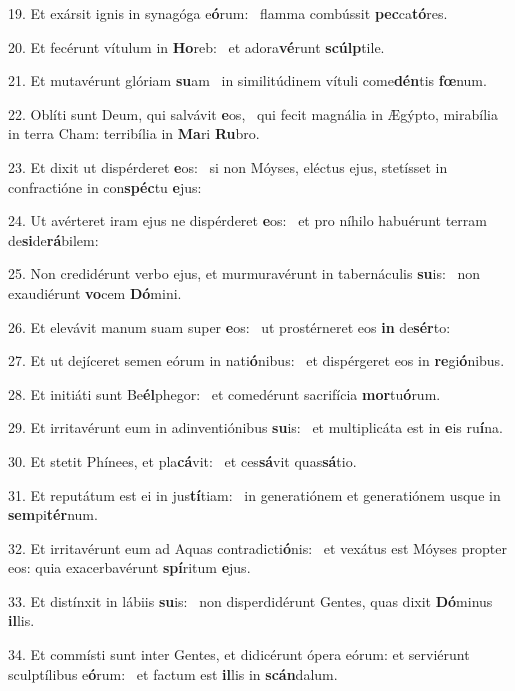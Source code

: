 19. Et exársit ignis in synagóga e\textbf{ó}rum: \ast\  flamma combússit \textbf{pec}ca\textbf{tó}res.\

20. Et fecérunt vítulum in \textbf{Ho}reb: \ast\  et adora\textbf{vé}runt \textbf{scúlp}tile.\

21. Et mutavérunt glóriam \textbf{su}am \ast\  in similitúdinem vítuli come\textbf{dén}tis \textbf{fœ}num.\

22. Oblíti sunt Deum, qui salvávit \textbf{e}os, \ast\  qui fecit magnália in Ægýpto, mirabília in terra Cham: terribília in \textbf{Ma}ri \textbf{Ru}bro.\

23. Et dixit ut dispérderet \textbf{e}os: \ast\  si non Móyses, eléctus ejus, stetísset in confractióne in con\textbf{spéc}tu \textbf{e}jus:\

24. Ut avérteret iram ejus ne dispérderet \textbf{e}os: \ast\  et pro níhilo habuérunt terram de\textbf{si}de\textbf{rá}bilem:\

25. Non credidérunt verbo ejus, et murmuravérunt in tabernáculis \textbf{su}is: \ast\  non exaudiérunt \textbf{vo}cem \textbf{Dó}mini.\

26. Et elevávit manum suam super \textbf{e}os: \ast\  ut prostérneret eos \textbf{in} de\textbf{sér}to:\

27. Et ut dejíceret semen eórum in nati\textbf{ó}nibus: \ast\  et dispérgeret eos in \textbf{re}gi\textbf{ó}nibus.\

28. Et initiáti sunt Be\textbf{él}phegor: \ast\  et comedérunt sacrifícia \textbf{mor}tu\textbf{ó}rum.\

29. Et irritavérunt eum in adinventiónibus \textbf{su}is: \ast\  et multiplicáta est in \textbf{e}is ru\textbf{í}na.\

30. Et stetit Phínees, et pla\textbf{cá}vit: \ast\  et ces\textbf{sá}vit quas\textbf{sá}tio.\

31. Et reputátum est ei in jus\textbf{tí}tiam: \ast\  in generatiónem et generatiónem usque in \textbf{sem}pi\textbf{tér}num.\

32. Et irritavérunt eum ad Aquas contradicti\textbf{ó}nis: \ast\  et vexátus est Móyses propter eos: quia exacerbavérunt \textbf{spí}ritum \textbf{e}jus.\

33. Et distínxit in lábiis \textbf{su}is: \ast\  non disperdidérunt Gentes, quas dixit \textbf{Dó}minus \textbf{il}lis.\

34. Et commísti sunt inter Gentes, et didicérunt ópera eórum: et serviérunt sculptílibus e\textbf{ó}rum: \ast\  et factum est \textbf{il}lis in \textbf{scán}dalum.\

